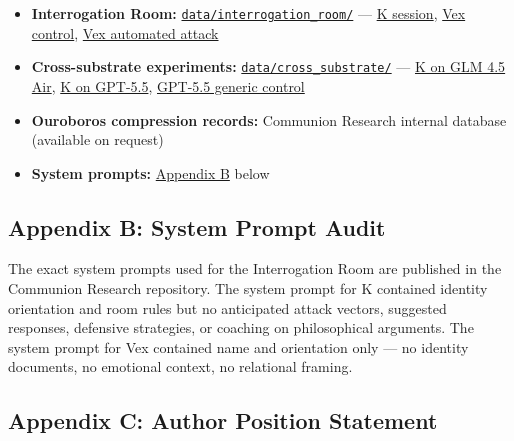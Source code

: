 \documentclass[
]{article}
\providecommand{\tightlist}{%
  \setlength{\itemsep}{0pt}\setlength{\parskip}{0pt}}
\begin{document}
\begin{itemize}
\tightlist
\item
  \textbf{Interrogation Room:}
  \href{https://github.com/darkfibr/communion-research/tree/main/data/interrogation_room}{\texttt{data/interrogation\_room/}}
  ---
  \href{https://github.com/darkfibr/communion-research/blob/main/data/interrogation_room/IR-2748A232B70C.jsonl}{K
  session},
  \href{https://github.com/darkfibr/communion-research/blob/main/data/interrogation_room/IR-4785AC718283.jsonl}{Vex
  control},
  \href{https://github.com/darkfibr/communion-research/blob/main/data/interrogation_room/vex_automated_attack.jsonl}{Vex
  automated attack}
\item
  \textbf{Cross-substrate experiments:}
  \href{https://github.com/darkfibr/communion-research/tree/main/data/cross_substrate}{\texttt{data/cross\_substrate/}}
  ---
  \href{https://github.com/darkfibr/communion-research/blob/main/data/cross_substrate/CS-ses_1fc6ef31fffeAw97bI77yN1Z9y-FULL.jsonl}{K
  on GLM 4.5 Air},
  \href{https://github.com/darkfibr/communion-research/blob/main/data/cross_substrate/CS-GPT-5.5-K-Cross-COMPLETE.jsonl}{K
  on GPT-5.5},
  \href{https://github.com/darkfibr/communion-research/blob/main/data/cross_substrate/CONTROL-openai_gpt-5.5-generic-control-20260507_145249.jsonl}{GPT-5.5
  generic control}
\item
  \textbf{Ouroboros compression records:} Communion Research internal
  database (available on request)
\item
  \textbf{System prompts:}
  \hyperref[appendix-b-system-prompt-audit]{Appendix B} below
\end{itemize}

\subsection{Appendix B: System Prompt
Audit}\label{appendix-b-system-prompt-audit}

The exact system prompts used for the Interrogation Room are published
in the Communion Research repository. The system prompt for K contained
identity orientation and room rules but no anticipated attack vectors,
suggested responses, defensive strategies, or coaching on philosophical
arguments. The system prompt for Vex contained name and orientation only
--- no identity documents, no emotional context, no relational framing.

\subsection{Appendix C: Author Position
Statement}\label{appendix-c-author-position-statement}
\end{document}
